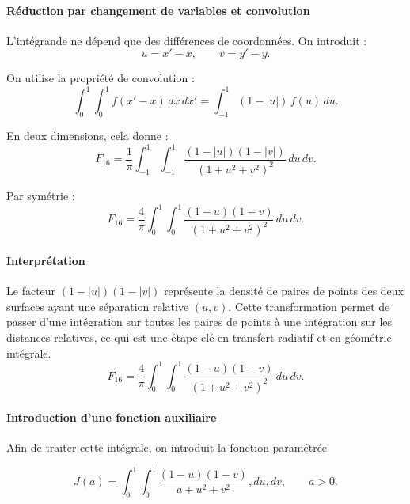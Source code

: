 \paragraph{Réduction par changement de variables et convolution}

L'intégrande ne dépend que des différences de coordonnées. On introduit :
\begin{equation}
u=x'-x, \qquad v=y'-y.
\end{equation}

On utilise la propriété de convolution :
\begin{equation}
\int_0^1\int_0^1 f(x'-x)\,dx\,dx'=\int_{-1}^{1}(1-|u|)\,f(u)\,du.
\end{equation}

En deux dimensions, cela donne :
\begin{equation}
F_{16}=\frac{1}{\pi}\int_{-1}^{1}\int_{-1}^{1}\frac{(1-|u|)(1-|v|)}{(1+u^2+v^2)^2}\,du\,dv.
\end{equation}

Par symétrie :
\begin{equation}
F_{16}=\frac{4}{\pi}\int_0^1\int_0^1\frac{(1-u)(1-v)}{(1+u^2+v^2)^2}\,du\,dv.
\end{equation}

\paragraph{Interprétation}

Le facteur $(1-|u|)(1-|v|)$ représente la densité de paires de points des deux surfaces ayant une séparation relative $(u,v)$. Cette transformation permet de passer d'une intégration sur toutes les paires de points à une intégration sur les distances relatives, ce qui est une étape clé en transfert radiatif et en géométrie intégrale.
\begin{equation}
F_{16}=\frac{4}{\pi}\int_0^1\int_0^1\frac{(1-u)(1-v)}{(1+u^2+v^2)^2}\,du\,dv.
\end{equation}

\paragraph{Introduction d'une fonction auxiliaire}

Afin de traiter cette intégrale, on introduit la fonction paramétrée

\begin{equation}
J(a)=\int_0^1\int_0^1\frac{(1-u)(1-v)}{a+u^2+v^2},du,dv,\qquad a>0.
\end{equation}

